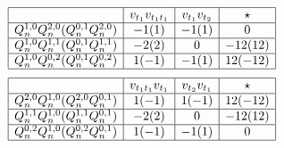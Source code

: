 \documentclass[11p,reqno]{amsart}
\numberwithin{equation}{section}
\numberwithin{equation}{section}
\begin{document}
\begin{align*} 
    \begin{array}{|c|c|c|c|}
        \hline
        & v_{t_1} v_{t_1t_1} & v_{t_1} v_{t_2} & \star \\ \hline
        Q_n^{1, 0}Q_n^{2, 0}(Q_n^{0, 1}Q_n^{2, 0}) & -1(1) & -1(1) & 0 \\ \hline
        Q_n^{1, 0}Q_n^{1, 1}(Q_n^{0, 1}Q_n^{1, 1}) & -2(2) & 0 & -12(12) \\ \hline
        Q_n^{1, 0}Q_n^{0, 2}(Q_n^{0, 1}Q_n^{0, 2}) & 1(-1) & -1(1) & 12(-12) \\ \hline
    \end{array} 
    \end{align*}
    \begin{align*}
    \begin{array}{|c|c|c|c|}
        \hline
        & v_{t_1t_1} v_{t_1} & v_{t_2} v_{t_1} & \star \\ \hline
        Q_n^{2, 0}Q_n^{1, 0}(Q_n^{2, 0}Q_n^{0, 1}) & 1(-1) & 1(-1) & 12(-12) \\ \hline
        Q_n^{1, 1}Q_n^{1, 0}(Q_n^{1, 1}Q_n^{0, 1}) & -2(2) & 0 & -12(12) \\ \hline
        Q_n^{0, 2}Q_n^{1, 0}(Q_n^{0, 2}Q_n^{0, 1}) & 1(-1) & -1(1) & 0 \\ \hline
    \end{array}
\end{align*}
\end{document}
